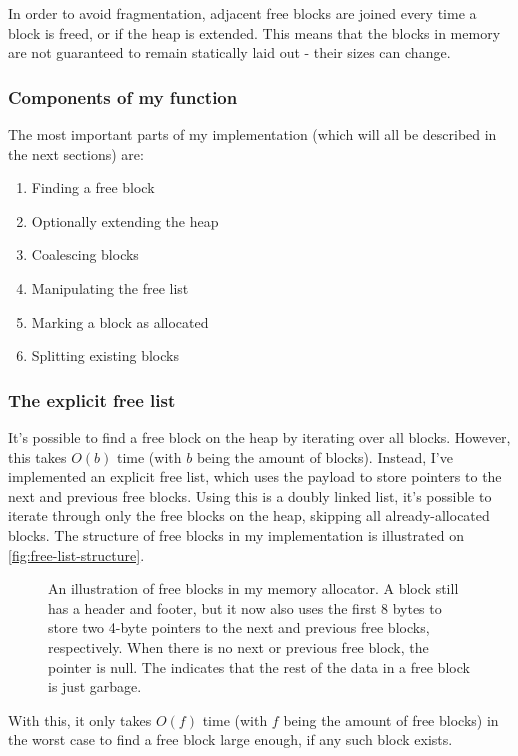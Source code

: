 In order to avoid fragmentation, adjacent free blocks are joined every time a block is freed, or if the heap is extended. This means that the blocks in memory are not guaranteed to remain statically laid out - their sizes can change.

\subsubsection{Components of my  function}

The most important parts of my  implementation (which will all be described in the next sections) are:

\begin{enumerate}
  \item Finding a free block
  \item Optionally extending the heap
  \item Coalescing blocks
  \item Manipulating the free list
  \item Marking a block as allocated
  \item Splitting existing blocks
\end{enumerate}

\subsubsection{The explicit free list}

It's possible to find a free block on the heap by iterating over all blocks. However, this takes $O(b)$ time (with $b$ being the amount of blocks). Instead, I've implemented an explicit free list, which uses the payload to store pointers to the next and previous free blocks. Using this is a doubly linked list, it's possible to iterate through only the free blocks on the heap, skipping all already-allocated blocks. The structure of free blocks in my implementation is illustrated on \autoref{fig:free-list-structure}.

\begin{figure}[H]
  \centering
  \hbox{}
  \caption{An illustration of free blocks in my memory allocator. A block still has a header and footer, but it now also uses the first 8 bytes to store two 4-byte pointers to the next and previous free blocks, respectively. When there is no next or previous free block, the pointer is null. The  indicates that the rest of the data in a free block is just garbage.}
  \label{fig:free-list-structure}
\end{figure}

With this, it only takes $O(f)$ time (with $f$ being the amount of free blocks) in the worst case to find a free block large enough, if any such block exists.
